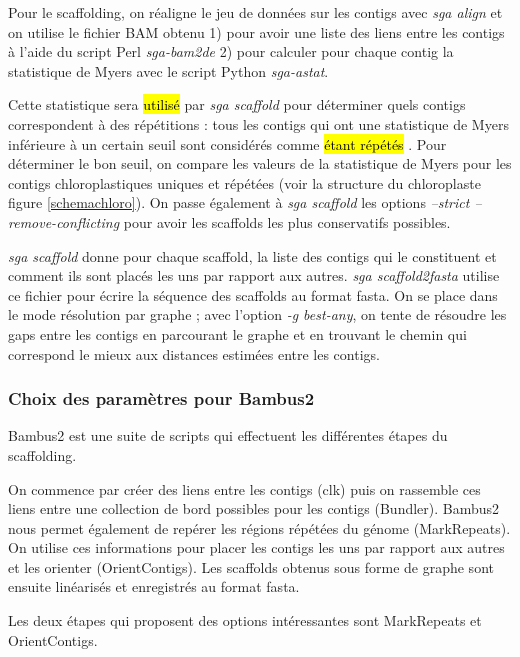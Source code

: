 \documentclass[a4paper]{article}
\newcommand{\rewrite}[1]{\todo[color=green!40]{#1}}
\newcommand{\hlrewrite}[2]{\sethlcolor{green} \hl{#1} \rewrite{#2}}
\begin{document}
Pour le scaffolding, on réaligne le jeu de données sur les contigs avec \textit{sga align} et on utilise le fichier BAM obtenu 1)
pour avoir une liste des liens entre les contigs à l'aide du script Perl \textit{sga-bam2de} 2) pour calculer pour chaque contig la statistique de Myers avec le script Python \textit{sga-astat}. 

Cette statistique sera \hlrewrite{utilisé}{utilisée} par \textit{sga scaffold} pour déterminer quels contigs correspondent à des répétitions : tous les contigs qui ont une statistique de Myers inférieure à un certain seuil sont considérés comme \hlrewrite{étant répétés}{des répétitions}. Pour déterminer le bon seuil, on compare les valeurs de la statistique de Myers pour les contigs chloroplastiques uniques et répétées (voir la structure du chloroplaste figure \ref{schemachloro}). On passe également à \textit{sga scaffold} les options \textit{--strict --remove-conflicting} pour avoir les scaffolds les plus conservatifs possibles. 

\textit{sga scaffold} donne pour chaque scaffold, la liste des contigs qui le constituent et comment ils sont placés les uns par rapport aux autres. \textit{sga scaffold2fasta} utilise ce fichier pour écrire la séquence des scaffolds au format fasta. On se place dans le mode résolution par graphe ; avec l'option \textit{-g best-any}, on tente de résoudre les gaps entre les contigs en parcourant le graphe et en trouvant le chemin qui correspond le mieux aux distances estimées entre les contigs. 

\subsubsection{Choix des paramètres pour Bambus2}

Bambus2 est une suite de scripts qui effectuent les différentes étapes du scaffolding. 

On commence par créer des liens entre les contigs (clk) puis on rassemble ces liens entre une collection de bord possibles pour les contigs (Bundler). Bambus2 nous permet également de repérer les régions répétées du génome (MarkRepeats). On  utilise ces informations pour placer les contigs les uns par rapport aux autres et les orienter (OrientContigs). Les scaffolds obtenus sous forme de graphe sont ensuite linéarisés et enregistrés au format fasta.  

Les deux étapes qui proposent des options intéressantes sont MarkRepeats et OrientContigs. 

\end{document}
